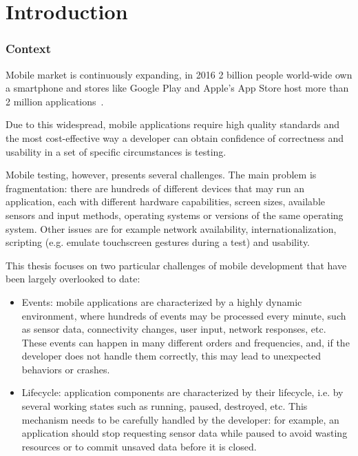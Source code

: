 \documentclass[11pt,a4paper,notitlepage]{article}
\newcommand{\emptypage} {\newpage\null\thispagestyle{empty}\newpage}
\begin{document}
\tableofcontents

\emptypage



\part{Introduction}

\section{Context}
Mobile market is continuously expanding, in 2016 2 billion people world-wide own a smartphone and stores like Google Play and Apple's App Store host more than 2 million applications~\cite{stats}.

Due to this widespread, mobile applications require high quality standards and the most cost-effective way a developer can obtain confidence of correctness and usability in a set of specific circumstances is testing.

Mobile testing, however, presents several challenges. The main problem is fragmentation: there are hundreds of different devices that may run an application, each with different hardware capabilities, screen sizes, available sensors and input methods, operating systems or versions of the same operating system. Other issues are for example network availability, internationalization, scripting (e.g. emulate touchscreen gestures during a test) and usability.

This thesis focuses on two particular challenges of mobile development that have been largely overlooked to date:
\begin{itemize}
	\item Events: mobile applications are characterized by a highly dynamic environment, where hundreds of events may be processed every minute, such as sensor data, connectivity changes, user input, network responses, etc. These events can happen in many different orders and frequencies, and, if the developer does not handle them correctly, this may lead to unexpected behaviors or crashes.
	\item Lifecycle: application components are characterized by their lifecycle, i.e. by several working states such as running, paused, destroyed, etc. This mechanism needs to be carefully handled by the developer: for example, an application should stop requesting sensor data while paused to avoid wasting resources or to commit unsaved data before it is closed.
\end{itemize}
\end{document}
